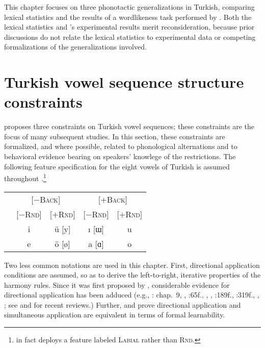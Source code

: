 This chapter focuses on three phonotactic generalizations in Turkish, comparing lexical statistics and the results of a wordlikeness task performed by \citet{Zimmer1969}.
Both the lexical statistics and \citeauthor{Zimmer1969}'s experimental results merit reconsideration, because prior discussions do not relate the lexical statistics to experimental data or competing formalizations of the generalizations involved.

\section{Turkish vowel sequence structure constraints}

\citet{Lees1966b,Lees1966a} proposes three constraints on Turkish vowel sequences; these constraints are the focus of many subsequent studies. In this section, these constraints are formalized, and where possible, related to phonological alternations and to behavioral evidence bearing on speakers' knowlege of the restrictions. The following feature specification for the eight vowels of Turkish is assumed throughout \citep[e.g.,][298]{Dresher2009}.\footnote{\citeauthor{Dresher2009} in fact deploys a feature labeled \textsc{Labial} rather than \textsc{Rnd}.}

\begin{example}
\begin{tabular}{c c c c c}
                       & \multicolumn{2}{c}{[$-$\textsc{Back}]} & \multicolumn{2}{c}{[$+$\textsc{Back}]} \\
                       & [$-$\textsc{Rnd}] & [$+$\textsc{Rnd}] & [$-$\textsc{Rnd}] & [$+$\textsc{Rnd}] \\ 
\cmidrule{2-5}
 & {i} & {ü} [y] & {ı} [ɯ] & {u} \\
 & {e} & {ö} [ø] & {a} [ɑ] & {o} \\
\end{tabular}
\end{example}

Two less common notations are used in this chapter.
First, directional application conditions are assumed, so as to derive the left-to-right, iterative properties of the harmony rules.
Since it was first proposed by \citet{Johnson1972}, considerable evidence for directional application has been adduced (e.g., \citealt{A74}: chap.~9, \citealt{GormanInPressc}, \citealt{Howard1972}:65f., \citealt{Kavitskaya2008}, \citealt{Kaye1982}, \citealt{KK77}:189f., \citeyear{KK79}:319f., \citealt{Piggott1975}, \citealt{Sohn1971}; see \citealt{McCarthy2003b} and \citealt{Wolf2011b} for recent reviews.)
Further, \citet{Johnson1972} and \citet{Kaplan1994} prove directional application and simultaneous application are equivalent in terms of formal learnability.


